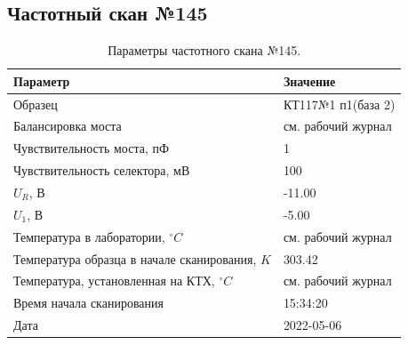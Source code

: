 \subsection{Частотный скан №145}
\begin{table}[!ht]
    \centering
    \caption{Параметры частотного скана №145.}
    \begin{tabular}{|l|l|}
        \hline
        Параметр                                       & Значение                  \\ \hline
        Образец                                        & КТ117№1 п1(база 2)        \\ \hline
        Балансировка моста                             & см. рабочий журнал        \\ \hline
        Чувствительность моста, пФ                     & 1                         \\ \hline
        Чувствительность селектора, мВ                 & 100                       \\ \hline
        $U_R$, В                                       & -11.00                    \\ \hline
        $U_1$, В                                       & -5.00                     \\ \hline
        Температура в лаборатории, $^\circ C$          & см. рабочий журнал        \\ \hline
        Температура образца в начале сканирования, $K$ & 303.42                    \\ \hline
        Температура, установленная на КТХ, $^\circ C$  & см. рабочий журнал        \\ \hline
        Время начала сканирования                      & 15:34:20                  \\ \hline
        Дата                                           & 2022-05-06                \\ \hline
    \end{tabular}
    \label{table:frequency_scan_145}
\end{table}

